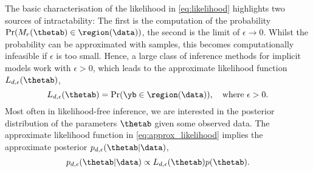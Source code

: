 The basic characterisation of the likelihood in \eqref{eq:likelihood} highlights two sources of intractability: The first is the computation of the probability $\Pr(M_r(\thetab) \in \region(\data))$, the second is the limit of $\epsilon \to 0$.
Whilst the probability can be approximated with samples, this becomes computationally infeasible if $\epsilon$ is too small. Hence, a large class of inference methods for implicit models work with $\epsilon >0$, which leads to the approximate likelihood function  $L_{d, \epsilon}(\thetab)$,
\begin{equation} \label{eq:approx_likelihood}
  L_{d, \epsilon}(\thetab) = \Pr(\yb \in \region(\data)), \quad \text{where  } \epsilon > 0.
\end{equation}
Most often in likelihood-free inference, we are interested in the posterior distribution of the parameters $\thetab$ given some observed data. The approximate likelihood function in \eqref{eq:approx_likelihood} implies the approximate posterior  $p_{d,\epsilon}(\thetab|\data)$, 
\begin{equation} \label{eq:approx_posterior}
  p_{d,\epsilon}(\thetab|\data) \propto L_{d, \epsilon}(\thetab) p(\thetab).
\end{equation}




